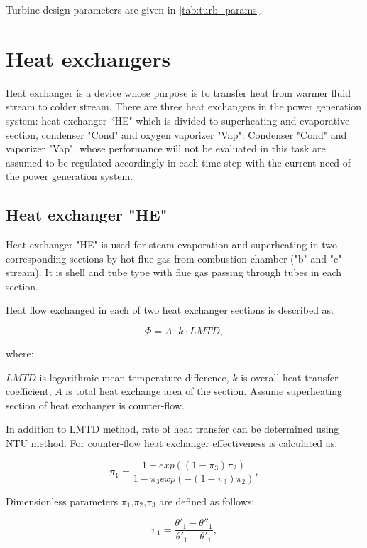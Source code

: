 \documentclass{article}
\begin{document}
	Turbine design parameters are given in \ref{tab:turb_params}.
	
	\section{Heat exchangers}
	
	Heat exchanger is a device whose purpose is to transfer heat from warmer fluid stream to colder stream. There are three heat exchangers in the power generation system: heat exchanger “HE" which is divided to superheating and evaporative section, condenser "Cond" and oxygen vaporizer "Vap". Condenser "Cond" and vaporizer "Vap", whose performance will not be evaluated in this task are assumed to be regulated accordingly in each time step with the current need of the power generation system. 
	
	\subsection*{Heat exchanger "HE"}
	
	Heat exchanger "HE" is used for steam evaporation and superheating in two corresponding sections by hot flue gas from combustion chamber ("b" and "c" stream). It is shell and tube type with flue gas passing through tubes in each section. 
	
	Heat flow exchanged in each of two heat exchanger sections is described as:
	
	\begin{equation}\label{eq:heat_flow}
		\Phi = A \cdot k \cdot LMTD,
	\end{equation}
	
	where:
	
	\noindent
	$LMTD$ is logarithmic mean temperature difference, 
	$k$ is overall heat transfer coefficient,
	$A$ is total heat exchange area of the section. 
	Assume superheating section of heat exchanger is counter-flow.
	
	In addition to LMTD method, rate of heat transfer can be determined using NTU method. For counter-flow heat exchanger effectiveness is calculated as:
	
	\begin{equation}\label{eq:heat_exchanger_eff}
		\pi_1 = \frac{1 - exp((1-\pi_3)\pi_2)}{1-\pi_3exp(-(1-\pi_3)\pi_2)},
	\end{equation}
	
	Dimensionless parameters $\pi_1$,$\pi_2$,$\pi_3$ are defined as follows:
	
	\begin{equation}\label{eq:pi_params}
		\pi_1 = \frac{\theta'_1 - \theta''_1}{\theta'_1 - \theta'_1},
	\end{equation}
	
\end{document}
